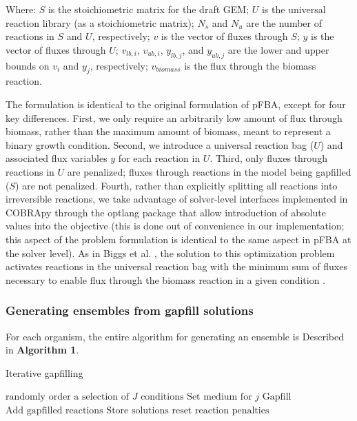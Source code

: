 \documentclass[11pt,twocolumn,notitlepage,openany,twoside]{book}
\begin{document}
\begin{refsection}
Where:
  $S$ is the stoichiometric matrix for the draft GEM;
	$U$ is the universal reaction library (as a stoichiometric matrix);
	$N_s$ and $N_u$ are the number of reactions in $S$ and $U$, respectively;
	$v$ is the vector of fluxes through $S$;
 	$y$ is the vector of fluxes through $U$;
	$v_{lb,i}$, $v_{ub,i}$, $y_{lb,j}$, and $y_{ub,j}$ are the lower and upper bounds on $v_i$ and $y_j$, respectively;
	$v_{biomass}$ is the flux through the biomass reaction.

The formulation is identical to the original formulation of pFBA, except for four key differences. First, we only require an arbitrarily low amount of flux through biomass, rather than the maximum amount of biomass, meant to represent a binary growth condition. Second, we introduce a universal reaction bag ($U$) and associated flux variables $y$ for each reaction in $U$. Third, only fluxes through reactions in $U$ are penalized; fluxes through reactions in the model being gapfilled ($S$) are not penalized. Fourth, rather than explicitly splitting all reactions into irreversible reactions, we take advantage of solver-level interfaces implemented in COBRApy through the optlang package \cite{Jensen2016-nu} that allow introduction of absolute values into the objective (this is done out of convenience in our implementation; this aspect of the problem formulation is identical to the same aspect in pFBA at the solver level). As in Biggs et al. , the solution to this optimization problem activates reactions in the universal reaction bag with the minimum sum of fluxes necessary to enable flux through the biomass reaction in a given condition \cite{Biggs2017-md}.

\subsubsection{Generating ensembles from gapfill solutions}

For each organism, the entire algorithm for generating an ensemble is Described in \textbf{Algorithm 1}.

\begin{algorithm}
  \caption{Iterative gapfilling}
  \begin{algorithmic}[1]
      \State $\mbox{randomly order a selection of $J$ conditions}$
        \State $\mbox{Set medium for $j$}$
        \State $\mbox{Gapfill}$
        \State $\mbox{Add gapfilled reactions}$
      \EndFor
      \State $\mbox{Store solutions}$
      \State $\mbox{reset reaction penalties}$
    \EndFor
  \end{algorithmic}
\end{algorithm}


\end{refsection}
\end{document}
